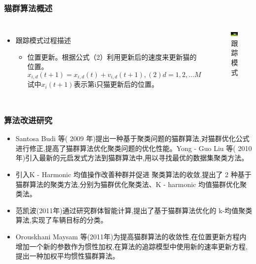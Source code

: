 \begin{frame}
	\frametitle{猫群算法概述}
	\begin{columns}
		\begin{itemize}
			\item {跟踪模式过程描述}
				\begin{itemize}
					\item {位置更新。根据公式（2）利用更新后的速度来更新猫的位置。$$x_{i,d}(t+1) = x_{i,d}(t) + v_{i,d}(t+1), (2) d = 1,2,…M$$ 试中$x_i(t+1)$表示第i只猫更新后的位置。}
				\end{itemize}
		\end{itemize}
		\begin{figure}[htbp]
			\centering
			\includegraphics[width=6cm]{pic/cat3.png}
			\caption{跟踪模式}
		\end{figure}
	\end{columns}
\end{frame}
\begin{frame}
	\frametitle{算法改进研究}
		\begin{itemize}
					\item {Santosa Budi 等( 2009 年)提出一种基于聚类问题的猫群算法,对猫群优化公式进行修正,提高了猫群算法优化聚类问题的优化性能。Yong - Guo Liu 等( 2010 年)引入最新的元启发式方法到猫群算法中,用以寻找最优的数据集聚类方法。}
					\item {引入K - Harmonic 均值操作改善种群并促进 聚类算法的收敛,提出了 2 种基于猫群算法的聚类方法,分别为猫群优化聚类法、K - harmonic 均值猫群优化聚类法。}
					\item {范凯波(2011年)通过研究群体智能计算,提出了基于猫群算法优化的 k-均值聚类算法,实现了车辆目标的分类。}
					\item {Orouskhani Maysam 等(2011年)为提高猫群算法的收敛性,在位置更新方程内增加一个新的参数作为惯性加权,在算法的追踪模型中使用新的速率更新方程,提出一种加权平均惯性猫群算法。}
			
		\end{itemize}

\end{frame}

